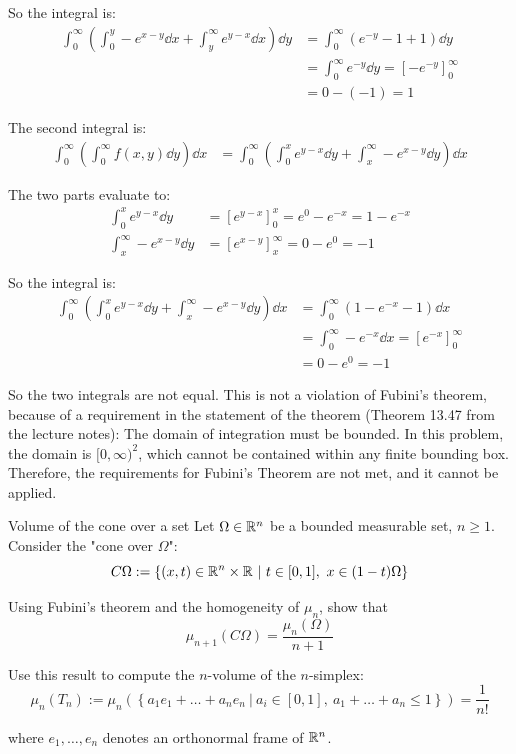 \documentclass[12pt]{article}
\begin{document}
So the integral is:
$$
\begin{aligned}
    \int_{0}^{\infty} \left( \int_{0}^{y} -e^{x-y} \dd x + \int_{y}^{\infty} e^{y-x} \dd x \right) \dd y &= \int_{0}^{\infty} \left( e^{-y} -1 + 1 \right) \dd y \\
    &= \int_{0}^{\infty} e^{-y} \dd y = \left[ -e^{-y} \right]_0^\infty \\
    &= 0 - (-1) = \boxed{1}
\end{aligned}   
$$

The second integral is:
$$
\begin{aligned}
    \int_{0}^{\infty} \left( \int_{0}^{\infty} f(x, y) \dd y \right) \dd x &= \int_{0}^{\infty} \left( \int_{0}^{x} e^{y-x} \dd y + \int_{x}^{\infty} -e^{x-y} \dd y \right) \dd x
\end{aligned} 
$$

The two parts evaluate to:
$$
\begin{aligned}
    \int_{0}^{x} e^{y-x} \dd y &= \left[ e^{y-x} \right]_0^x = e^0 - e^{-x} = 1 - e^{-x} \\
    \int_{x}^{\infty} -e^{x-y} \dd y &= \left[ e^{x-y} \right]_x^{\infty} = 0 - e^{0} = -1
\end{aligned}
$$

So the integral is:
$$
\begin{aligned}
    \int_{0}^{\infty} \left( \int_{0}^{x} e^{y-x} \dd y + \int_{x}^{\infty} -e^{x-y} \dd y \right) \dd x &= \int_{0}^{\infty} \left( 1 - e^{-x} - 1 \right) \dd x \\
    &= \int_{0}^{\infty} -e^{-x} \dd x = \left[ e^{-x} \right]_0^\infty\\
    &= 0 - e^0 = \boxed{-1}
\end{aligned} 
$$

So the two integrals are not equal. This is not a violation of Fubini's theorem, because of a requirement in the statement of the theorem (Theorem 13.47 from the lecture notes): The domain of integration must be bounded. In this problem, the domain is $[0, \infty)^2$, which cannot be contained within any finite bounding box. Therefore, the requirements for Fubini's Theorem are not met, and it cannot be applied.

\begin{problem}{Volume of the cone over a set}{}
    Let $\Omega \in \mathbb{R}^n$ be a bounded measurable set, $n \geq 1$. Consider the "cone over $\Omega$":
    $$
        C\Omega := \left\{ (x, t) \in \mathbb{R}^n \times \mathbb{R} \ |\ t \in [0, 1],\ x \in (1-t)\Omega \right\}
    $$

    Using Fubini's theorem and the homogeneity of $\mu_n$, show that
    $$
        \mu_{n+1}(C\Omega) = \frac{\mu_n(\Omega)}{n + 1}
    $$

    Use this result to compute the $n$-volume of the $n$-simplex:
    $$
        \mu_n(T_n) := \mu_n\left( \left\{ a_1e_1 + \dots + a_ne_n \ |\ a_i \in [0, 1],\ a_1 + \dots + a_n \leq 1 \right\} \right) = \frac{1}{n!}
    $$

    where $e_1,\dots,e_n$ denotes an orthonormal frame of $\mathbb{R}^n$.
\end{problem}
\end{document}
